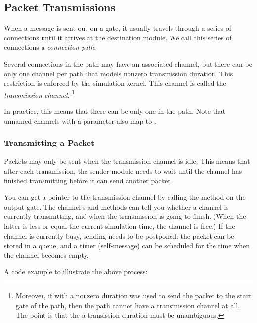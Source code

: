 \subsection{Packet Transmissions}
\label{sec:simple-modules:packet-transmission}

When a message is sent out on a gate, it usually travels through
a series of connections until it arrives at the destination module.
We call this series of connections a \textit{connection path}.

Several connections in the path may have an associated channel,
but there can be only one channel per path that models nonzero
transmission duration. This restriction is enforced by the simulation
kernel. This channel is called the \textit{transmission channel}.
  \footnote{Moreover, if  with a nonzero duration
  was used to send the packet to the start gate of the path,
  then the path cannot have a transmission channel at all.
  The point is that the a transission duration must be unambiguous.}

\begin{note}
  In practice, this means that there can be only one 
  in the path. Note that unnamed channels with a  parameter
  also map to .
\end{note}

\subsubsection{Transmitting a Packet}
\label{sec:simple-modules:transmitting-a-packet}

Packets may only be sent when the transmission channel is idle.
This means that after each transmission, the sender module needs
to wait until the channel has finished transmitting before it can
send another packet.

You can get a pointer to the transmission channel by calling the
 method on the output gate.
The channel's  and 
methods can tell you whether a channel is currently transmitting,
and when the transmission is going to finish. (When the latter is
less or equal the current simulation time, the channel is free.)
If the channel is currently busy, sending needs to be postponed:
the packet can be stored in a queue, and a timer (self-message) can be
scheduled for the time when the channel becomes empty.

A code example to illustrate the above process:

